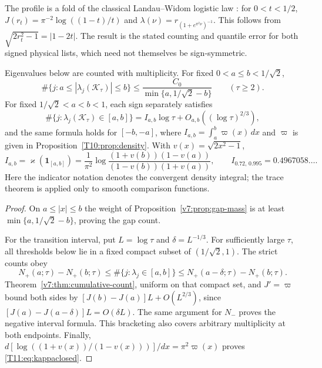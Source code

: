 The profile is a fold of the classical Landau--Widom logistic law
\cite{LandauWidom1980}: for $0<t<1/2$,
$J(r_t)=\pi^{-2}\log((1-t)/t)$ and
$\lambda(\nu)=r_{(1+e^{\pi^2\nu})^{-1}}$.
This follows from $\sqrt{2r_t^2-1}=|1-2t|$. The result is the stated
counting and quantile error for both signed physical lists, which need
not themselves be sign-symmetric.

\begin{corollary}
\label{rev5:cor:counts}
Eigenvalues below are counted with multiplicity.  For fixed
$0<a\le b<1/\sqrt2$,
\begin{equation}\label{rev5:eq:gap-count}
 \#\{j:a\le|\lambda_j(\mathcal K_\tau)|\le b\}
 \le\frac{C_0}{\min\{a,1/\sqrt2-b\}}\qquad(\tau\ge2).
\end{equation}
For fixed $1/\sqrt2<a<b<1$, each sign separately satisfies
\begin{equation}\label{rev5:eq:band-count}
 \#\{j:\lambda_j(\mathcal K_\tau)\in[a,b]\}
 =I_{a,b}\log\tau+O_{a,b}((\log\tau)^{2/3}),
\end{equation}
and the same formula holds for $[-b,-a]$, where
$I_{a,b}=\int_a^b\varpi(x)\,dx$ and $\varpi$ is given in
Proposition~\ref{T10:prop:density}.  With $v(x)=\sqrt{2x^2-1}$,
\begin{equation}\label{T11:eq:kappaclosed}
 I_{a,b}=\varkappa(\mathbf1_{[a,b]})
 =\frac1{\pi^2}\log
   \frac{(1+v(b))(1-v(a))}{(1-v(b))(1+v(a))},\qquad
 I_{0.72,\,0.995}=0.4967058\ldots .
\end{equation}
Here the indicator notation denotes the convergent density integral;
the trace theorem is applied only to smooth comparison functions.
\end{corollary}

\begin{proof}
On $a\le|x|\le b$ the weight of Proposition~\ref{v7:prop:gap-mass}
is at least $\min\{a,1/\sqrt2-b\}$, proving the gap count.

For the transition interval, put $L=\log\tau$ and
$\delta=L^{-1/3}$. For sufficiently large $\tau$, all thresholds below
lie in a fixed compact subset of $(1/\sqrt2,1)$. The strict counts obey
\[
 N_+(a;\tau)-N_+(b;\tau)
 \le\#\{j:\lambda_j\in[a,b]\}
 \le N_+(a-\delta;\tau)-N_+(b;\tau).
\]
Theorem~\ref{v7:thm:cumulative-count}, uniform on that compact set,
and $J'=\varpi$ bound both sides by
$[J(b)-J(a)]L+O(L^{2/3})$, since
$[J(a)-J(a-\delta)]L=O(\delta L)$.
The same argument for $N_-$ proves the negative interval formula.
This bracketing also covers arbitrary multiplicity at both endpoints.
Finally,
$d[\log((1+v(x))/(1-v(x)))]/dx=\pi^2\varpi(x)$
proves \eqref{T11:eq:kappaclosed}.
\end{proof}

